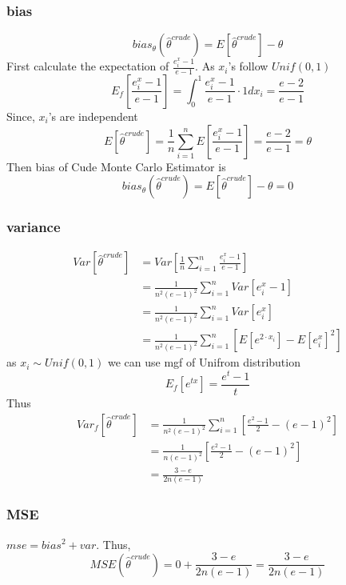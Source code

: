 \documentclass[11pt]{article}
\begin{document}
    \subsubsection{bias}\label{bias}

\[
bias_\theta (\hat{\theta}^{crude})= E[\hat{\theta}^{crude}] - \theta
\] First calculate the expectation of \(\frac{e^x_i-1}{e-1}\). As
\(x_i\)'s follow \(Unif(0,1)\) \[
E_f\left[\frac{e^x_i-1}{e-1}\right] = \int_{0}^{1}\frac{e^x_i-1}{e-1}\cdot 1 dx_i = \frac{e-2}{e-1}
\] Since, \(x_i\)'s are independent \[
E[\hat{\theta}^{crude}] = \frac{1}{n}\sum_{i=1}^{n} E\left[\frac{e^x_i-1}{e-1}\right] = \frac{e-2}{e-1} = \theta
\] Then bias of Cude Monte Carlo Estimator is \[
bias_\theta (\hat{\theta}^{crude})= E[\hat{\theta}^{crude}] - \theta = 0
\]

    \subsubsection{variance}\label{variance}

\[
\begin{align*}
Var[\hat{\theta}^{crude}]  &= Var\left[\frac{1}{n}\sum_{i=1}^{n}\frac{e^x_i-1}{e-1}\right]\\
& = \frac{1}{n^2 (e-1)^2}\sum_{i=1}^{n}Var[e^x_i-1]\\
& = \frac{1}{n^2 (e-1)^2}\sum_{i=1}^{n}Var[e^x_i]\\
& = \frac{1}{n^2 (e-1)^2}\sum_{i=1}^{n}\left[ E[e^{2\cdot x_i}] - E[e^x_i]^2 \right]
\end{align*}
\] as \(x_i \sim Unif(0,1)\) we can use mgf of Unifrom distribution \[
E_f[e^{tx}] = \frac{e^t -1}{t}
\] Thus \[
\begin{align*}
Var_f[\hat{\theta}^{crude}] & = \frac{1}{n^2 (e-1)^2}\sum_{i=1}^{n}\left[ \frac{e^2-1}{2} - (e-1)^2 \right]\\
&=\frac{1}{n (e-1)^2}\left[ \frac{e^2-1}{2} - (e-1)^2 \right]\\
&=\frac{3-e}{2n(e-1)}
\end{align*}
\]

    \subsubsection{MSE}\label{mse}

\(mse = bias^2 + var\). Thus, \[
MSE(\hat{\theta}^{crude}) = 0 + \frac{3-e}{2n(e-1)} = \frac{3-e}{2n(e-1)}
\]
\end{document}
